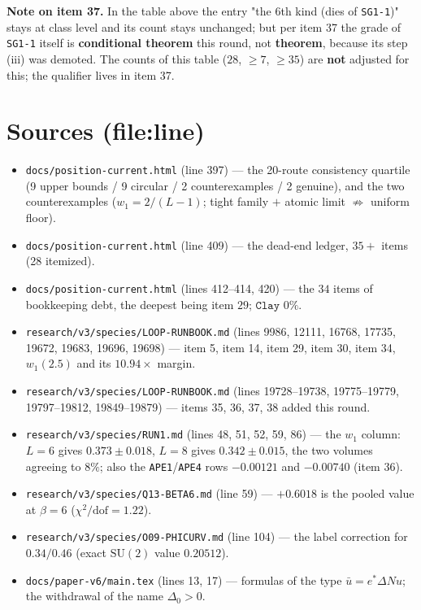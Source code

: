 \documentclass[11pt,a4paper]{article}
\newcommand{\lvT}{\textcolor{cT}{\textbf{theorem}}}
\newcommand{\lvC}{\textcolor{cC}{\textbf{conditional theorem}}}
\newcommand{\bet}{\beta}
\newcommand{\Dzero}{\Delta_0}
\newcommand{\ubar}{\bar{u}}
\begin{document}
\noindent\textbf{Note on item 37.} In the table above the entry "the 6th kind (dies of \texttt{SG1-1})" stays at class level and its count stays unchanged; but per item 37 the grade of \texttt{SG1-1} itself is \lvC{} this round, not \lvT, because its step (iii) was demoted. The counts of this table ($28$, $\ge 7$, $\ge 35$) are \textbf{not} adjusted for this; the qualifier lives in item 37.

\section*{Sources (file:line)}
\small
\begin{itemize}[leftmargin=1.3em,itemsep=1.5pt,topsep=2pt]
  \item \texttt{docs/position-current.html} (line 397) --- the 20-route consistency quartile (9 upper bounds / 9 circular / 2 counterexamples / 2 genuine), and the two counterexamples ($w_1=2/(L-1)$; tight family $+$ atomic limit $\not\Rightarrow$ uniform floor).
  \item \texttt{docs/position-current.html} (line 409) --- the dead-end ledger, $35+$ items (28 itemized).
  \item \texttt{docs/position-current.html} (lines 412--414, 420) --- the $34$ items of bookkeeping debt, the deepest being item $29$; $\texttt{Clay }0\%$.
  \item \texttt{research/v3/species/LOOP-RUNBOOK.md} (lines 9986, 12111, 16768, 17735, 19672, 19683, 19696, 19698) --- item 5, item 14, item 29, item 30, item 34, $w_1(2.5)$ and its $10.94\times$ margin.
  \item \texttt{research/v3/species/LOOP-RUNBOOK.md} (lines 19728--19738, 19775--19779, 19797--19812, 19849--19879) --- items 35, 36, 37, 38 added this round.
  \item \texttt{research/v3/species/RUN1.md} (lines 48, 51, 52, 59, 86) --- the $w_1$ column: $L=6$ gives $0.373\pm0.018$, $L=8$ gives $0.342\pm0.015$, the two volumes agreeing to $8\%$; also the \texttt{APE1}/\texttt{APE4} rows $-0.00121$ and $-0.00740$ (item 36).
  \item \texttt{research/v3/species/Q13-BETA6.md} (line 59) --- $+0.6018$ is the pooled value at $\bet=6$ ($\chi^2/\mathrm{dof}=1.22$).
  \item \texttt{research/v3/species/O09-PHICURV.md} (line 104) --- the label correction for $0.34/0.46$ (exact $\mathrm{SU}(2)$ value $0.20512$).
  \item \texttt{docs/paper-v6/main.tex} (lines 13, 17) --- formulas of the type $\ubar=e^\ast\Delta N u$; the withdrawal of the name $\Dzero>0$.
\end{itemize}
\end{document}
